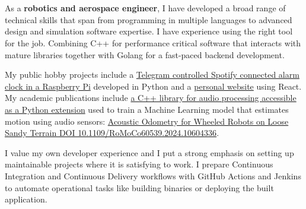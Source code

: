  \section*{\faWrench} \label{sec:skills}

As a \textbf{robotics and aerospace engineer}, I have developed a broad range
of technical skills that span from programming in multiple languages to
advanced design and simulation software expertise. I have experience using the
right tool for the job. Combining C++ for performance critical software that
interacts with mature libraries together with Golang for a fast-paced backend
development.

My public hobby projects include a
\href{https://github.com/esdandreu/WakePi}{Telegram controlled Spotify
connected alarm clock in a Raspberry Pi} developed in Python and a
\href{https://github.com/esdandreu/esdandreu.github.io}{personal website} using
React. My academic publications include
\href{https://github.com/AcousticOdometry/AO}{a C++ library for audio
processing accessible as a Python extension} used to train a Machine Learning
model that estimates motion using audio sensors:
\href{https://ieeexplore.ieee.org/document/10604336}{Acoustic Odometry for
Wheeled Robots on Loose Sandy Terrain DOI 10.1109/RoMoCo60539.2024.10604336}. 

I value my own developer experience and I put a strong emphasis on setting up
maintainable projects where it is satisfying to work. I prepare Continuous
Integration and Continuous Delivery workflows with GitHub Actions and Jenkins
to automate operational tasks like building binaries or deploying the built
application.

